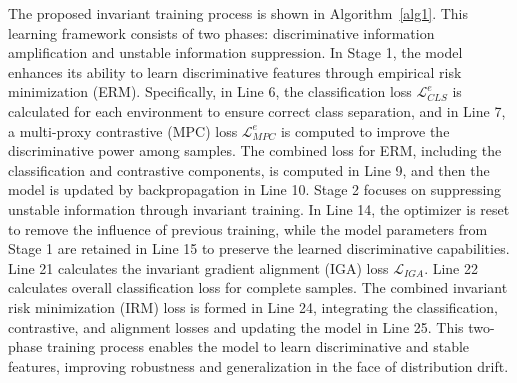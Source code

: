 The proposed invariant training process is shown in Algorithm~\ref{alg1}. This learning framework consists of two phases: discriminative information amplification and unstable information suppression. In Stage 1, the model enhances its ability to learn discriminative features through empirical risk minimization (ERM). Specifically, in Line 6, the classification loss $\mathcal{L}^{e}_{CLS}$ is calculated for each environment to ensure correct class separation, and in Line 7, a multi-proxy contrastive (MPC) loss $\mathcal{L}^{e}_{MPC}$ is computed to improve the discriminative power among samples. The combined loss for ERM, including the classification and contrastive components, is computed in Line 9, and then the model is updated by backpropagation in Line 10. Stage 2 focuses on suppressing unstable information through invariant training. In Line 14, the optimizer is reset to remove the influence of previous training, while the model parameters from Stage 1 are retained in Line 15 to preserve the learned discriminative capabilities. Line 21 calculates the invariant gradient alignment (IGA) loss $\mathcal{L}_{IGA}$. Line 22 calculates overall classification loss for complete samples. The combined invariant risk minimization (IRM) loss is formed in Line 24, integrating the classification, contrastive, and alignment losses and updating the model in Line 25. This two-phase training process enables the model to learn discriminative and stable features, improving robustness and generalization in the face of distribution drift.




